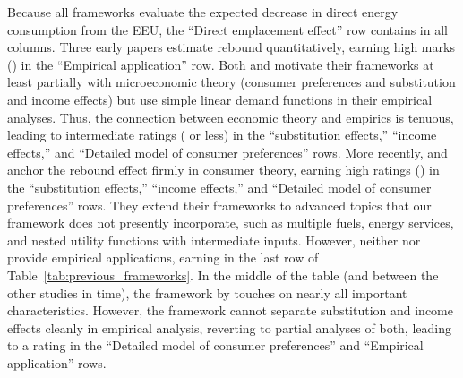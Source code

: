 \documentclass[12pt]{article}\usepackage[]{graphicx}\usepackage[]{xcolor}
\begin{document}


Because all frameworks evaluate the expected decrease 
in direct energy consumption from the EEU,
the ``Direct emplacement effect'' row contains  
in all columns.
Three early papers \citep{Nassen:2009aa, Thomas:2013aa, Thomas:2013ab}
estimate rebound quantitatively, 
earning high marks () in the ``Empirical application'' row. 
Both \citeauthor{Nassen:2009aa} and \citeauthor{Thomas:2013aa} 
motivate their frameworks at least partially with microeconomic theory
(consumer preferences and substitution and income effects)
but use simple linear demand functions in their empirical analyses.  
Thus, the connection between economic theory and empirics is tenuous, 
leading to intermediate ratings ( or less) in the
``substitution effects,''
``income effects,''
and
``Detailed model of consumer preferences'' rows.
More recently, \citet{Chan2015} and \citet{Wang2021}
anchor the rebound effect firmly in consumer theory, 
earning high ratings () in the
``substitution effects,''
``income effects,'' and 
``Detailed model of consumer preferences'' rows. 
They extend their frameworks to advanced topics
that our framework does not presently incorporate,
such as
multiple fuels,  
energy services, and
nested utility functions with intermediate inputs. 
However, neither \citeauthor{Chan2015} nor \citeauthor{Wang2021} 
provide empirical applications,
earning  in the last row of Table~\ref{tab:previous_frameworks}. 
In the middle of the table (and between the other studies in time), 
the framework by \citet{Borenstein:2015aa}
touches on nearly all important characteristics.
However, the \citeauthor{Borenstein:2015aa} framework
cannot separate substitution and income effects cleanly in empirical analysis, 
reverting to partial analyses of both, 
leading to a  rating in the ``Detailed model of consumer preferences'' 
and ``Empirical application'' rows.
\end{document}
